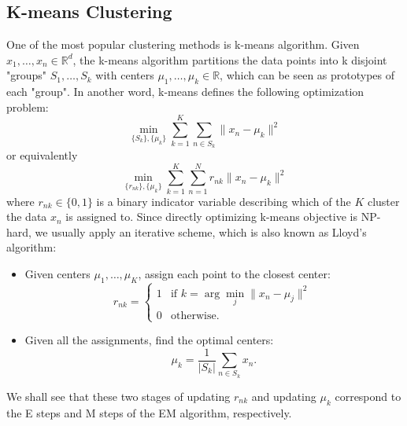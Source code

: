 \documentclass[../main.tex]{subfiles}
\begin{document}
\subsection{K-means Clustering}
One of the most popular clustering methods is k-means algorithm. Given $x_1,\dots,x_n\in \mathbb{R}^d$, the k-means algorithm partitions the data points into k disjoint "groups" $S_1,\dots,S_k$ with centers $\mu_1,\dots,\mu_k\in \mathbb{R}$, which can be seen as prototypes of each "group". In another word, k-means defines the following optimization problem:
\begin{equation*}
\min_{\{S_k\},\{\mu_k\}}\sum_{k=1}^{K}\sum_{n\in S_k}\|x_n-\mu_k\|^2
\end{equation*}
or equivalently
\begin{equation*}
\min_{\{r_{nk}\},\{\mu_k\}}\sum_{k=1}^{K}\sum_{n=1}^{N}r_{nk}\|x_n-\mu_k\|^2
\end{equation*}
where $r_{nk}\in \{0,1\}$ is a binary indicator variable describing which of the $K$ cluster the data $x_n$ is assigned to. Since directly optimizing k-means objective is NP-hard, we usually apply an iterative scheme, which is also known as Lloyd's algorithm:
\begin{itemize}
	\item Given centers $\mu_1,\dots,\mu_K$, assign each point to the closest center:
	\begin{equation*}
	r_{nk}=\begin{cases}
	1& \text{if }k=\arg\min_j\|x_n-\mu_j\|^2\\
	0& \text{otherwise.}
	\end{cases}
	\end{equation*}
	\item Given all the assignments, find the optimal centers:
	\begin{equation*}
	\mu_k = \frac{1}{|S_k|}\sum_{n\in S_k}x_n.
	\end{equation*}
\end{itemize}
We shall see that these two stages of updating $r_{nk}$ and updating $\mu_k$ correspond to the E steps and M steps of the EM algorithm, respectively.
\end{document}

